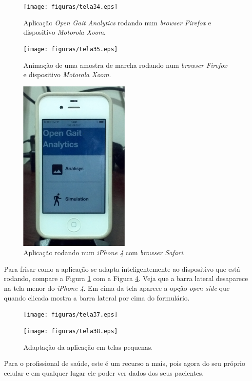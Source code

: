 \begin{figure}[H]
	\centering
	\texttt{[image: figuras/tela34.eps]}
	\caption{Aplicação \emph{Open Gait Analytics} rodando num \emph{browser Firefox} e dispositivo \emph{Motorola Xoom}.}
\label{tela34}
\end{figure}

\begin{figure}[H]
	\centering
	\texttt{[image: figuras/tela35.eps]}
	\caption{Animação de uma amostra de marcha rodando num \emph{browser Firefox} e dispositivo \emph{Motorola Xoom}.}
\label{tela35}
\end{figure}

\begin{figure}[H]
	\centering
	\includegraphics[width=5.5cm]{figuras/tela36.eps}
	\caption{Aplicação rodando num \emph{iPhone 4} com \emph{browser Safari}.}
\label{tela36}
\end{figure}


Para frisar como a aplicação se adapta inteligentemente ao dispositivo que está rodando, compare a Figura \ref{tela34} com a Figura \ref{comp1}. 
Veja que a barra lateral desaparece na tela menor do \emph{iPhone 4}. Em cima da tela aparece a opção \emph{open side} que quando clicada mostra a barra lateral por cima do formulário.
\begin{figure}[H]
  \centering
  \begin{minipage}[b]{0.35\textwidth}
    \texttt{[image: figuras/tela37.eps]}
  \end{minipage}
  \hfill
  \begin{minipage}[b]{0.35\textwidth}
    \texttt{[image: figuras/tela38.eps]}
  \end{minipage}
  \caption{Adaptação da aplicação em telas pequenas.}
  \label{comp1}
\end{figure}


Para o profissional de saúde, este é um recurso a mais, pois agora do seu próprio celular e em qualquer lugar ele poder ver dados dos seus pacientes.

